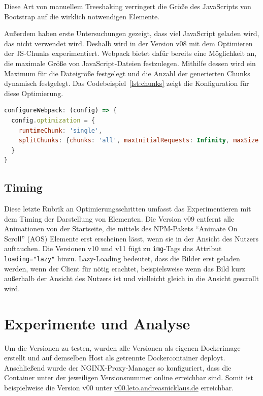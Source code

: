 \documentclass[11pt,a4paper]{article}
\begin{document}
Diese Art von manuellem Treeshaking verringert die Größe des JavaScripts von Bootstrap auf die wirklich notwendigen Elemente.

Außerdem haben erste Untersuchungen gezeigt, dass viel JavaScript geladen wird, das nicht verwendet wird.
Deshalb wird in der Version v08 mit dem Optimieren der JS-Chunks experimentiert.
Webpack bietet dafür bereits eine Möglichkeit an, die maximale Größe von JavaScript-Dateien festzulegen.
Mithilfe dessen wird ein Maximum für die Dateigröße festgelegt und die Anzahl der generierten Chunks dynamisch festgelegt.
Das Codebeispiel~\ref{lst:chunks} zeigt die Konfiguration für diese Optimierung.

\begin{lstlisting}[language=JavaScript, caption={Konfiguration von Webpack zur Limitierung der Chunkgröße}, label={lst:chunks}]
configureWebpack: (config) => {
  config.optimization = {
    runtimeChunk: 'single',
    splitChunks: {chunks: 'all', maxInitialRequests: Infinity, maxSize: 500000}
  }
}
\end{lstlisting}

\subsection{Timing}
Diese letzte Rubrik an Optimierungsschritten umfasst das Experimentieren mit dem Timing der Darstellung von Elementen.
Die Version v09 entfernt alle Animationen von der Startseite, die mittels des NPM-Pakets \enquote{Animate On Scroll} (AOS) Elemente erst erscheinen lässt, wenn sie in der Ansicht des Nutzers auftauchen.
Die Versionen v10 und v11 fügt zu \verb|img|-Tags das Attribut \verb|loading="lazy"| hinzu.
Lazy-Loading bedeutet, dass die Bilder erst geladen werden, wenn der Client für nötig erachtet, beispielsweise wenn das Bild kurz außerhalb der Ansicht des Nutzers ist und vielleicht gleich in die Ansicht gescrollt wird.

\section{Experimente und Analyse}\label{sec:experimente}
Um die Versionen zu testen, wurden alle Versionen als eigenen Dockerimage erstellt und auf demselben Host als getrennte Dockercontainer deployt.
Anschließend wurde der NGINX-Proxy-Manager so konfiguriert, dass die Container unter der jeweiligen Versionsnummer online erreichbar sind.
Somit ist beispielweise die Version v00 unter \href{https://v00.leto.andreasnicklaus.de}{v00.leto.andreasnicklaus.de} erreichbar.
\end{document}
